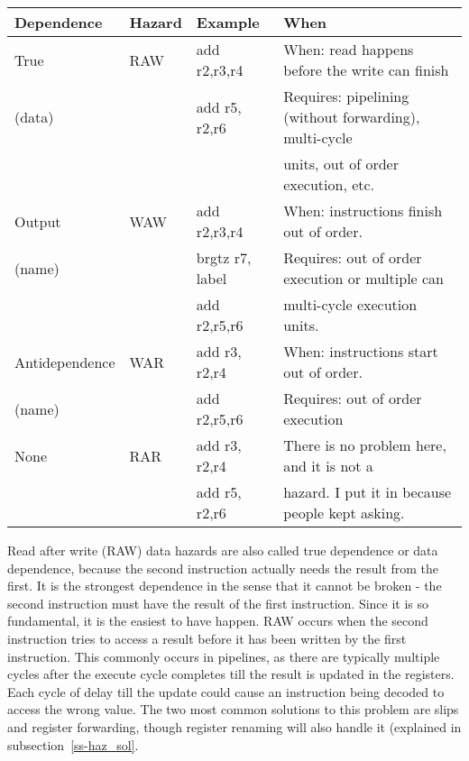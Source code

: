 \begin{tabular}{|l|l|l|p{3in}|} \hline
  Dependence      & Hazard & Example                     & When  \\ \hline
  True            & RAW    & add {\color{red} r2},r3,r4  & When: read happens before the write can finish   \\
  (data)          &        & add r5,{\color{red} r2},r6  & Requires: pipelining (without forwarding), multi-cycle \\
                  &        &                             &   units, out of order execution, etc. \\ \hline
                  
  Output          & WAW    & add {\color{red} r2},r3,r4  & When: instructions finish out of order. \\
  (name)          &        & brgtz r7, label             & Requires: out of order execution or multiple can \\
                  &        & add {\color{red} r2},r5,r6  & multi-cycle execution units. \\ \hline

  Antidependence  & WAR    & add r3,{\color{red} r2},r4  & When: instructions start out of order. \\
  (name)          &        & add {\color{red} r2},r5,r6  & Requires: out of order execution \\ \hline

  None            & RAR    & add r3,{\color{red} r2},r4  & There is no problem here, and it is not a \\
                  &        & add r5,{\color{red} r2},r6  & hazard. I put it in because people kept asking. \\ \hline
\end{tabular}

Read after write (RAW) data hazards are also called true dependence or data dependence, because the second instruction actually needs the result from the first.  It is the strongest dependence in the sense that it cannot be broken - the second instruction must have the result of the first instruction.  Since it is so fundamental, it is the easiest to have happen.  RAW occurs when the second instruction tries to access a result before it has been written by the first instruction.  This commonly occurs in pipelines, as there are typically multiple cycles after the execute cycle completes till the result is updated in the registers.  Each cycle of delay till the update could cause an instruction being decoded to access the wrong value.  The two most common solutions to this problem are slips and register forwarding, though register renaming will also handle it (explained in subsection~\ref{ss-haz_sol}.

